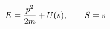 \documentclass[preview]{standalone}
\begin{document}
\begin{align*}
\special{dvisvgm:raw <g id='unique000'>}E=\frac{p^2}{2m}+U(s),\qquad S=s\special{dvisvgm:raw </g>}
\end{align*}
\end{document}
